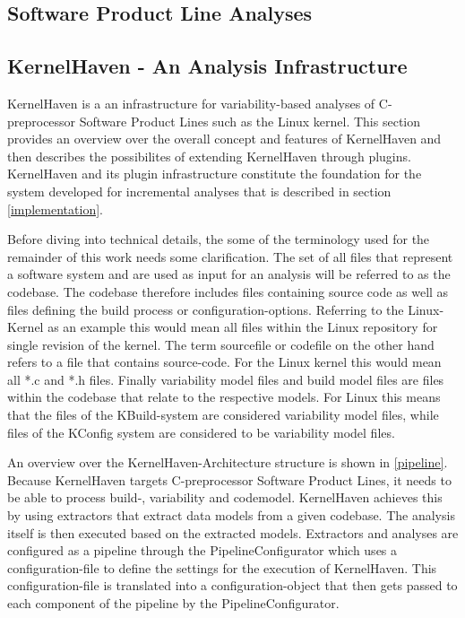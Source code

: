 \documentclass[a4paper]{article}
\begin{document}
\newpage

\subsection{Software Product Line Analyses}


\newpage
\subsection{KernelHaven - An Analysis Infrastructure}\label{kernelhaven}

KernelHaven is a an infrastructure for variability-based analyses of C-preprocessor Software Product Lines\cite{KroeherEl-SharkawySchmid18} such as the Linux kernel. This section  provides an overview over the overall concept and features of KernelHaven and then describes the possibilites of extending KernelHaven through plugins. KernelHaven and its plugin infrastructure constitute the foundation for the system developed for incremental analyses that is described in section \ref{implementation}. 

Before diving into technical details, the some of the terminology used for the remainder of this work needs some clarification. The set of all files  that represent a software system and are used as input for an analysis will be referred to as the codebase. The codebase therefore includes files containing source code as well as files defining the build process or configuration-options. Referring to the Linux-Kernel as an example this would mean all files within the Linux repository for single revision of the kernel.
The term sourcefile or codefile on the other hand refers to a file that contains source-code. For the Linux kernel this would mean all *.c and *.h files. Finally variability model files and build model files are files within the codebase that relate to the respective models. For Linux this means that the files of the KBuild-system are considered variability model files, while files of the KConfig system are considered to be variability model files.

An overview over the KernelHaven-Architecture structure is shown in \autoref{pipeline}. Because KernelHaven targets C-preprocessor Software Product Lines, it needs to be able to process build-, variability and codemodel. KernelHaven achieves this by using extractors that extract data models from a given codebase. The analysis itself is then executed based on the extracted models. Extractors and analyses are configured as a pipeline through the PipelineConfigurator which uses a configuration-file to define the settings for the execution of KernelHaven. This configuration-file is translated into a configuration-object that then gets passed to each component of the pipeline by the PipelineConfigurator. 
\end{document}
